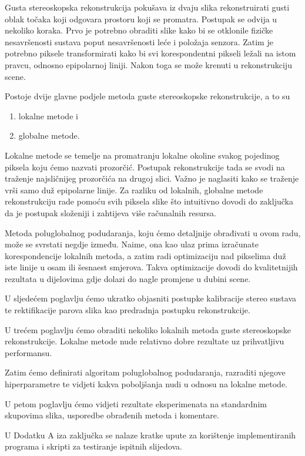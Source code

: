 \documentclass[utf8, zavrsni, numeric]{fer}
\begin{document}
Gusta stereoskopska rekonstrukcija pokušava iz dvaju slika rekonstruirati gusti oblak točaka koji
odgovara prostoru koji se promatra. Postupak se odvija u nekoliko koraka.
Prvo je potrebno obraditi slike kako bi se otklonile fizičke nesavršenosti sustava poput nesavršenosti leće i položaja senzora. Zatim je potrebno piksele
transformirati kako bi svi korespondentni pikseli ležali na istom pravcu, odnosno epipolarnoj liniji. Nakon toga se može krenuti u rekonstrukciju scene.

Postoje dvije glavne podjele metoda guste stereoskopske rekonstrukcije, a to su
\begin{enumerate}
  \item lokalne metode i
  \item globalne metode.
\end{enumerate}

Lokalne metode se temelje na promatranju lokalne okoline svakog pojedinog piksela koju ćemo nazvati prozorčić.
Postupak rekonstrukcije tada se svodi na traženje najsličnijeg prozorčića na drugoj slici. Važno je naglasiti kako se traženje vrši samo duž epipolarne linije.
Za razliku od lokalnih, globalne metode rekonstrukciju rade pomoću svih piksela slike što intuitivno dovodi do zaključka da je postupak složeniji i zahtijeva više računalnih resursa.

Metoda poluglobalnog podudaranja, koju ćemo detaljnije obrađivati u ovom radu, može se svrstati negdje između. Naime, ona kao ulaz prima izračunate korespondencije lokalnih metoda, a zatim radi optimizaciju nad pikselima duž iste linije u osam ili šesnaest smjerova. Takva optimizacije dovodi do kvalitetnijih rezultata u dijelovima gdje dolazi do nagle promjene u dubini scene.

U sljedećem poglavlju ćemo ukratko objasniti postupke kalibracije stereo sustava te rektifikacije parova slika kao predradnja postupku rekonstrukcije.

U trećem poglavlju ćemo obraditi nekoliko lokalnih metoda guste stereoskopske rekonstrukcije. Lokalne metode nude relativno dobre rezultate uz prihvatljivu performansu.

Zatim ćemo definirati algoritam poluglobalnog podudaranja, razraditi njegove hiperparametre te vidjeti kakva poboljšanja nudi u odnosu na lokalne metode.

U petom poglavlju ćemo vidjeti rezultate eksperimenata na standardnim skupovima slika, usporedbe obrađenih metoda i komentare.

U Dodatku A iza zaključka se nalaze kratke upute za korištenje implementiranih programa i skripti za testiranje ispitnih slijedova.
\end{document}
